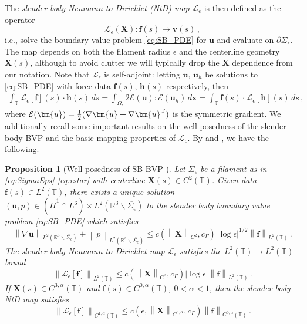 \documentclass[11pt,reqno]{amsart}
\newcommand{\R}{\mathbb{R}}
\newcommand{\T}{\mathbb{T}}
\newcommand{\E}{\mathcal{E}}
\newcommand{\bu}{\bm{u}}
\newcommand{\bx}{\bm{x}}
\newcommand{\X}{\bm{X}}
\newcommand{\p}{\partial}
\newcommand{\abs}[1]{\left\lvert #1 \right\rvert}
\newcommand{\norm}[1]{\left\lVert #1 \right\rVert}
\newcommand{\mc}[1]{\mathcal{#1}}
\newtheorem{proposition}[theorem]{Proposition}
\theoremstyle{definition}
\begin{document}
The \emph{slender body Neumann-to-Dirichlet (NtD) map} $\mc{L}_\epsilon$ is then defined as the operator
\begin{equation}\label{eq:SB_NtD}
\mc{L}_\epsilon(\X) : \bm{f}(s) \mapsto \bm{v}(s)\,,
\end{equation}
i.e., solve the boundary value problem \eqref{eq:SB_PDE} for $\bu$ and evaluate on $\p\Sigma_\epsilon$. The map depends on both the filament radius $\epsilon$ and the centerline geometry $\X(s)$, although to avoid clutter we will typically drop the $\X$ dependence from our notation. Note that $\mc{L}_\epsilon$ is self-adjoint: letting $\bu$, $\bu_h$ be solutions to \eqref{eq:SB_PDE} with force data $\bm{f}(s)$, $\bm{h}(s)$ respectively, then 
\begin{equation}\label{eq:selfadjoint_Leps}
\begin{aligned}
  \int_\T \mc{L}_\epsilon[\bm{f}](s)\cdot\bm{h}(s)\,ds 
  = \int_{\Omega_\epsilon}2\E(\bu):\E(\bu_h)\,d\bx
  = \int_\T \bm{f}(s)\cdot\mc{L}_\epsilon[\bm{h}](s)\,ds\,,
\end{aligned}
\end{equation}
where $\E(\bu)=\frac{1}{2}(\nabla\bu+\nabla\bu^{\rm T})$ is the symmetric gradient.
%
%
We additionally recall some important results on the well-posedness of the slender body BVP and the basic mapping properties of $\mc{L}_\epsilon$. By \cite[Theorem 1.2]{closed_loop} and \cite[Lemma 1.14]{ohm2024free}, we have the following. 
%
%
\begin{proposition}[Well-posedness of SB BVP \cite{closed_loop,ohm2024free}]\label{prop:SB_BVP}
  Let $\Sigma_\epsilon$ be a filament as in \eqref{eq:SigmaEps}-\eqref{eq:rstar} with centerline $\X(s)\in C^2(\T)$. Given data $\bm{f}(s)\in L^2(\T)$, there exists a unique solution $(\bu,p)\in (\dot H^1\cap L^6)\times L^2(\R^3\backslash \overline{\Sigma_\epsilon})$ to the slender body boundary value problem \eqref{eq:SB_PDE} which satisfies 
  \begin{equation}\label{eq:up_ests}
    \norm{\nabla\bu}_{L^2(\R^3\backslash \overline{\Sigma_\epsilon})} + \norm{p}_{L^2(\R^3\backslash \overline{\Sigma_\epsilon})}\le c(\norm{\X}_{C^2},c_\Gamma)\abs{\log\epsilon}^{1/2}\norm{\bm{f}}_{L^2(\T)}\,.
  \end{equation}
  The slender body Neumann-to-Dirichlet map $\mc{L}_\epsilon$ satisfies the $L^2(\T)\to L^2(\T)$ bound
\begin{equation}
  \norm{\mc{L}_\epsilon[\bm{f}]}_{L^2(\T)} \le c(\norm{\X}_{C^2},c_\Gamma)\abs{\log\epsilon}\norm{\bm{f}}_{L^2(\T)}\,.
\end{equation} 
%
%
If $\X(s)\in C^{3,\alpha}(\T)$ and $\bm{f}(s)\in C^{0,\alpha}(\T)$, $0<\alpha<1$, then the slender body NtD map satisfies 
\begin{equation}
  \norm{\mc{L}_\epsilon[\bm{f}]}_{C^{1,\alpha}(\T)} \le c(\epsilon,\norm{\X}_{C^{3,\alpha}},c_\Gamma)\norm{\bm{f}}_{C^{0,\alpha}(\T)}\,.
\end{equation} 
\end{proposition}
 
\end{document}
